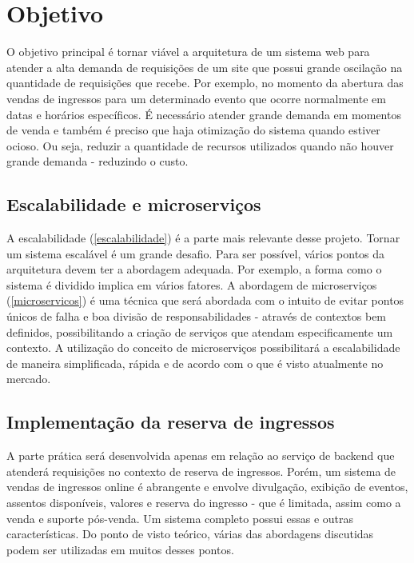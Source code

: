 \chapter{Objetivo}

O objetivo principal é tornar viável a arquitetura de um sistema web para atender
a alta demanda de requisições de um site que possui grande oscilação na quantidade de
requisições que recebe.
Por exemplo, no momento da abertura das vendas de ingressos para um determinado evento
que ocorre normalmente em datas e horários específicos. É necessário atender grande demanda
em momentos de venda e também é preciso que haja otimização do sistema quando estiver ocioso.
Ou seja, reduzir a quantidade de recursos utilizados quando não houver
grande demanda - reduzindo o custo.

\section{Escalabilidade e microserviços}
A escalabilidade (\autoref{escalabilidade}) é a parte mais relevante desse projeto.
Tornar um sistema escalável é um grande desafio.
Para ser possível, vários pontos da arquitetura devem ter a
abordagem adequada. Por exemplo, a forma como o sistema é dividido implica em vários
fatores.
A abordagem de microserviços (\autoref{microservicos}) é uma técnica que será abordada
com o intuito de evitar pontos únicos de falha e boa divisão de responsabilidades
- através de contextos bem definidos, possibilitando a criação de serviços que
atendam especificamente um contexto.
A utilização do conceito de microserviços possibilitará a escalabilidade de maneira
simplificada, rápida e de acordo com o que é visto atualmente no mercado.

\section{Implementação da reserva de ingressos}

A parte prática será desenvolvida apenas em relação ao serviço de backend que
atenderá requisições no contexto de reserva de ingressos.
Porém, um sistema de vendas de ingressos online é abrangente e envolve divulgação,
exibição de eventos, assentos disponíveis, valores e reserva do ingresso -
que é limitada, assim como a venda e suporte pós-venda. Um sistema completo possui essas
e outras características. Do ponto de visto teórico, várias das abordagens discutidas
podem ser utilizadas em muitos desses pontos.

